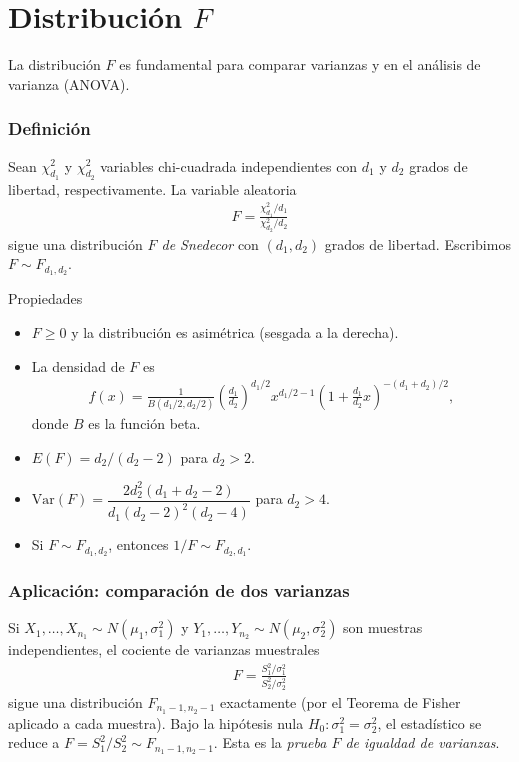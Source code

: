 \section{Distribución $F$}

La distribuci\'on $F$ es fundamental para comparar varianzas y en el an\'alisis de
varianza (ANOVA).

\subsubsection{Definici\'on}

\begin{definicion}[Distribuci\'on $F$]
Sean $\chi^2_{d_1}$ y $\chi^2_{d_2}$ variables chi-cuadrada independientes con
$d_1$ y $d_2$ grados de libertad, respectivamente. La variable aleatoria
\begin{align}
 \label{eq:3.2.15}
 F = \frac{\chi^2_{d_1}/d_1}{\chi^2_{d_2}/d_2}
\end{align}
sigue una distribuci\'on \emph{$F$ de Snedecor} con $(d_1, d_2)$ grados de libertad.
Escribimos $F \sim F_{d_1, d_2}$.
\end{definicion}

{Propiedades}
\begin{itemize}
 \item $F \geq 0$ y la distribuci\'on es asim\'etrica (sesgada a la derecha).
 \item La densidad de $F$ es
 \begin{align}
  \label{eq:3.2.16}
  f(x) = \frac{1}{B(d_1/2, d_2/2)} \left(\frac{d_1}{d_2}\right)^{d_1/2}
  x^{d_1/2 - 1} \left(1 + \frac{d_1}{d_2}x\right)^{-(d_1+d_2)/2},
  \end{align}
  donde $B$ es la funci\'on beta.
 \item $E(F) = d_2/(d_2 - 2)$ para $d_2 > 2$.
 \item $\text{Var}(F) = \dfrac{2 d_2^2 (d_1 + d_2 - 2)}{d_1 (d_2 - 2)^2 (d_2 - 4)}$ para $d_2 > 4$.
 \item Si $F \sim F_{d_1, d_2}$, entonces $1/F \sim F_{d_2, d_1}$.
\end{itemize}

\subsubsection{Aplicaci\'on: comparaci\'on de dos varianzas}

Si $X_1, \ldots, X_{n_1} \sim N(\mu_1, \sigma_1^2)$ y $Y_1, \ldots, Y_{n_2} \sim N(\mu_2, \sigma_2^2)$
son muestras independientes, el cociente de varianzas muestrales
\begin{align}
 \label{eq:3.2.17}
 F = \frac{S_1^2/\sigma_1^2}{S_2^2/\sigma_2^2}
\end{align}
sigue una distribuci\'on $F_{n_1 - 1, n_2 - 1}$ exactamente (por el Teorema de Fisher
aplicado a cada muestra). Bajo la hip\'otesis nula $H_0: \sigma_1^2 = \sigma_2^2$, el
estad\'istico se reduce a $F = S_1^2/S_2^2 \sim F_{n_1-1, n_2-1}$. Esta es la
\emph{prueba $F$ de igualdad de varianzas}.

